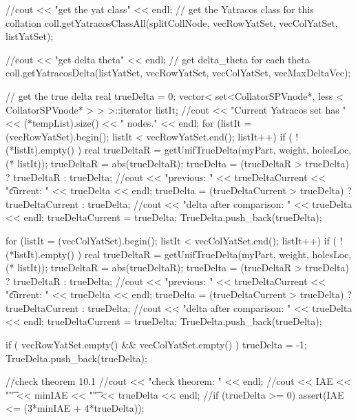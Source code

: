 \begin{DoxyCode}
{{{        //cout << "get the yat class" << endl;
        // get the Yatracos class for this collation
        coll.getYatracosClassAll(splitCollNode, vecRowYatSet,
                            vecColYatSet, listYatSet);

        //cout << "get delta theta" << endl;
        // get delta_theta for each theta
        coll.getYatracosDelta(listYatSet, vecRowYatSet, vecColYatSet, 
                        vecMaxDeltaVec);

        // get the true delta
        real trueDelta = 0;
        vector< set<CollatorSPVnode*, less < CollatorSPVnode* > > >::iterator 
      listIt;   
        //cout << "Current Yatracos set has " << (*tempList).size() << "
       nodes." << endl;
        for (listIt = (vecRowYatSet).begin(); listIt < vecRowYatSet.end(); 
      listIt++) {
          if ( !(*listIt).empty() ) {
            real trueDeltaR = getUnifTrueDelta(myPart, weight, holesLoc, (*
      listIt));
            trueDeltaR = abs(trueDeltaR);
            trueDelta = (trueDeltaR > trueDelta) ? trueDeltaR : trueDelta;
            //cout << "previous: " << trueDeltaCurrent << "\t current: " <<
       trueDelta << endl;
            trueDelta = (trueDeltaCurrent > trueDelta) ? trueDeltaCurrent : 
      trueDelta;
            //cout << "delta after comparison: " << trueDelta << endl;
            trueDeltaCurrent = trueDelta;
            TrueDelta.push_back(trueDelta);
          }
        }

        for (listIt = (vecColYatSet).begin(); listIt < vecColYatSet.end(); 
      listIt++) {
          if ( !(*listIt).empty() ) {
            real trueDeltaR = getUnifTrueDelta(myPart, weight, holesLoc, (*
      listIt));
            trueDeltaR = abs(trueDeltaR);
            trueDelta = (trueDeltaR > trueDelta) ? trueDeltaR : trueDelta;
            //cout << "previous: " << trueDeltaCurrent << "\t current: " <<
       trueDelta << endl;
            trueDelta = (trueDeltaCurrent > trueDelta) ? trueDeltaCurrent : 
      trueDelta;
            //cout << "delta after comparison: " << trueDelta << endl;
            trueDeltaCurrent = trueDelta;
            TrueDelta.push_back(trueDelta);
          }
        }

        if ( vecRowYatSet.empty() && vecColYatSet.empty() ) { trueDelta = -1; 
      TrueDelta.push_back(trueDelta); } 

        //check theorem 10.1
        //cout << "check theorem: " << endl;
        //cout << IAE << "\t" << minIAE << "\t" << trueDelta << endl;
        //if (trueDelta >= 0) { assert(IAE <= (3*minIAE + 4*trueDelta)); }

}}}
\end{DoxyCode}

